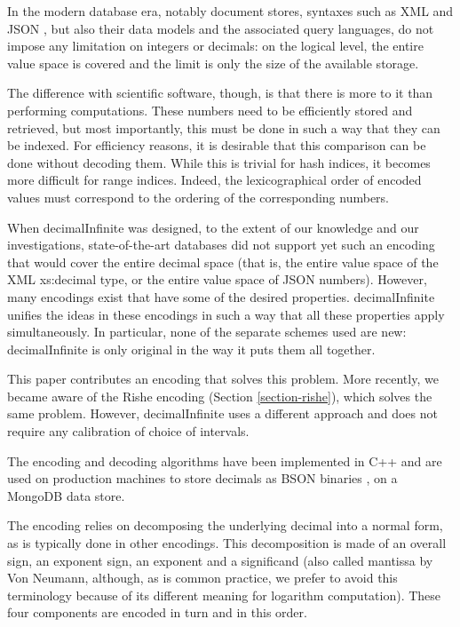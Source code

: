 \documentclass{acm_proc_article-sp}
\begin{document}
In the modern database era, notably document stores, syntaxes such as XML \cite{XML} and JSON \cite{JSON}, but also their data models and the associated query languages, do not impose any limitation on integers or decimals: on the logical level, the entire value space is covered and the limit is only the size of the available storage.

The difference with scientific software, though, is that there is more to it than performing computations. These numbers need to be efficiently stored and retrieved, but most importantly, this must be done in such a way that they can be indexed. For efficiency reasons, it is desirable that this comparison can be done without decoding them. While this is trivial for hash indices, it becomes more difficult for range indices. Indeed, the lexicographical order of encoded values must correspond to the ordering of the corresponding numbers.

When decimalInfinite was designed, to the extent of our knowledge and our investigations, state-of-the-art databases did not support yet such an encoding that would cover the entire decimal space (that is, the entire value space of the XML xs:decimal type, or the entire value space of JSON numbers). However, many encodings exist that have some of the desired properties. decimalInfinite unifies the ideas in these encodings in such a way that all these properties apply simultaneously. In particular, none of the separate schemes used are new: decimalInfinite is only original in the way it puts them all together.

This paper contributes an encoding that solves this problem. More recently, we became aware of the Rishe encoding (Section \ref{section-rishe}), which solves the same problem. However, decimalInfinite uses a different approach and does not require any calibration of choice of intervals.

The encoding and decoding algorithms have been implemented in C++ and are used on production machines to store decimals as BSON binaries \cite{BSON}, on a MongoDB \cite{MongoDB} data store.

The encoding relies on decomposing the underlying decimal into a normal form, as is typically done in other encodings. This decomposition is made of an overall sign, an exponent sign, an exponent and a significand (also called mantissa by Von Neumann, although, as is common practice, we prefer to avoid this terminology because of its different meaning for logarithm computation). These four components are encoded in turn and in this order.
\end{document}
